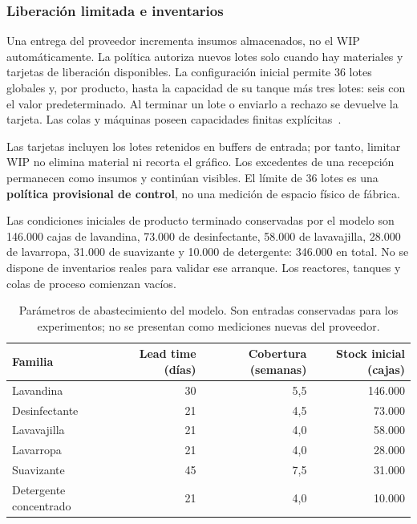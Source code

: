 \documentclass[11pt, a4paper]{article}
\begin{document}
\subsubsection{Liberación limitada e inventarios}
Una entrega del proveedor incrementa insumos almacenados, no el WIP automáticamente. La política autoriza nuevos lotes solo cuando hay materiales y tarjetas de liberación disponibles. La configuración inicial permite 36 lotes globales y, por producto, hasta la capacidad de su tanque más tres lotes: seis con el valor predeterminado. Al terminar un lote o enviarlo a rechazo se devuelve la tarjeta. Las colas y máquinas poseen capacidades finitas explícitas~\cite{anylogic-queue,anylogic-delay}.

Las tarjetas incluyen los lotes retenidos en buffers de entrada; por tanto, limitar WIP no elimina material ni recorta el gráfico. Los excedentes de una recepción permanecen como insumos y continúan visibles. El límite de 36 lotes es una \textbf{política provisional de control}, no una medición de espacio físico de fábrica.

Las condiciones iniciales de producto terminado conservadas por el modelo son 146.000 cajas de lavandina, 73.000 de desinfectante, 58.000 de lavavajilla, 28.000 de lavarropa, 31.000 de suavizante y 10.000 de detergente: 346.000 en total. No se dispone de inventarios reales para validar ese arranque. Los reactores, tanques y colas de proceso comienzan vacíos.

\begin{table}[htbp]
\centering\small
\caption{Parámetros de abastecimiento del modelo. Son entradas conservadas para los experimentos; no se presentan como mediciones nuevas del proveedor.}
\label{tab:abastecimiento}
\begin{tabularx}{\textwidth}{Xrrr}
\toprule
Familia & Lead time (días) & Cobertura (semanas) & Stock inicial (cajas) \\
\midrule
Lavandina & 30 & 5,5 & 146.000 \\
Desinfectante & 21 & 4,5 & 73.000 \\
Lavavajilla & 21 & 4,0 & 58.000 \\
Lavarropa & 21 & 4,0 & 28.000 \\
Suavizante & 45 & 7,5 & 31.000 \\
Detergente concentrado & 21 & 4,0 & 10.000 \\
\bottomrule
\end{tabularx}
\end{table}
\end{document}
